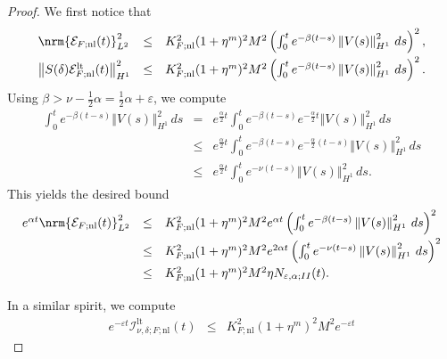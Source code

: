 \documentclass[10pt]{articleHJ}
\newcommand{\e}{\ensuremath{\varepsilon}}
\renewcommand{\a}{\ensuremath{\alpha}}
\DeclarePairedDelimiter{\nrm}\lVert\rVert
\newcommand{\norm}[1]{\left\Vert#1\right\Vert}		%
\numberwithin{equation}{section}
\begin{document}
\begin{proof}
We first notice that
\begin{equation}
\begin{array}{lcl}
\nrm{\mathcal{E}_{F;\mathrm{nl}}(t)}_{L^2}^2
& \le &
   K^2_{F;\mathrm{nl}}(1 + \eta^m)^2 M^2  \left(
     \int_0^{t} e^{-\beta(t - s) } \norm{V(s)}^2_{H^1} \, ds
     \right)^2 ,
\\[0.2cm]
%
\norm{S(\delta)\mathcal{E}^{\mathrm{lt}}_{F;\mathrm{nl}}(t)}_{H^1}^2
& \le &
     K^2_{F;\mathrm{nl}}(1 + \eta^m)^2 M^2  \left(
     \int_0^{t} e^{-\beta(t - s) } \norm{V(s)}^2_{H^1} \, ds
     \right)^2 .
\end{array}
\end{equation}
Using $\beta > \nu - \frac{1}{2} \alpha
= \frac{1}{2} \alpha + \e$,
we compute
\begin{equation}
\begin{array}{lcl}
  \int_0^{t} e^{-\beta(t - s) } \norm{V(s)}_{H^1}^2 \, ds
& = &
  e^{\frac{\alpha}{2} t}
  \int_0^{t} e^{-\beta(t - s) } e^{-\frac{\alpha}{2} t} \norm{V(s)}_{H^1}^2 \, ds
\\[0.2cm]
& \le &
  e^{\frac{\alpha}{2} t}
  \int_0^{t} e^{-\beta(t - s) } e^{-\frac{\alpha}{2} (t-s)} \norm{V(s)}_{H^1}^2 \, ds
\\[0.2cm]
& \le &
  e^{\frac{\alpha}{2} t}
  \int_0^{t} e^{-\nu(t - s) } \norm{V(s)}_{H^1}^2 \, ds.
\end{array}
\end{equation}
This yields the desired bound
\begin{equation}
\begin{array}{lcl}
e^{\a t }\nrm{\mathcal{E}_{F;\mathrm{nl}}(t)}_{L^2}^2
  &\leq  &
K_{F;\mathrm{nl}}^2(1 + \eta^m )^2 M^2 e^{\alpha t} \left(
     \int_0^{t} e^{-\beta(t - s) } \norm{V(s)}_{H^1}^2 \, ds \right)^2
 \\[0.2cm]
& \le &
  K_{F;\mathrm{nl}}^2(1 + \eta^m )^2 M^2 e^{2 \alpha t} \left(
     \int_0^{t} e^{-\nu(t - s) }  \norm{V(s)}_{H^1}^2 \, ds \right)^2
\\[0.2cm]
& \le &
  K_{F;\mathrm{nl}}^2(1 + \eta^m )^2 M^2 \eta N_{\e,\alpha;II}(t) .
\\[0.2cm]
\end{array}
\end{equation}
In a similar spirit, we compute
\begin{equation}
\begin{array}{lcl}
 e^{-\e t} \mathcal{I}^{\mathrm{lt}}_{\nu,\delta ; F;\mathrm{nl}}(t)
  & \le &
  K_{F;\mathrm{nl}}^2 (1 + \eta^m )^2 M^2 e^{-\e t}

\end{array}
\end{equation}
\end{proof}
\end{document}
